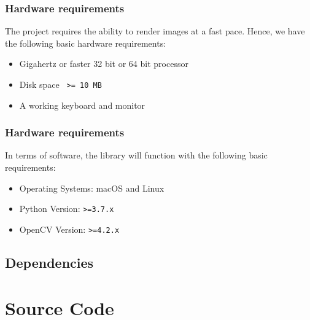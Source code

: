 \documentclass[11pt]{article}
\begin{document}
\subsubsection{Hardware requirements}

The project requires the ability to render images at a fast pace. Hence, we have the following basic hardware requirements:

\begin{itemize}
	\item Gigahertz or faster 32 bit or 64 bit processor
	\item Disk space \texttt{ >= 10 MB}
	\item A working keyboard and monitor
\end{itemize} 

\subsubsection{Hardware requirements}

In terms of software, the library will function with the following basic requirements:

\begin{itemize}
	\item Operating Systems: macOS and Linux 
	\item Python Version: \texttt{>=3.7.x}
	\item OpenCV Version: \texttt{>=4.2.x}
\end{itemize}

\subsection{Dependencies}



\section{Source Code}
\end{document}
